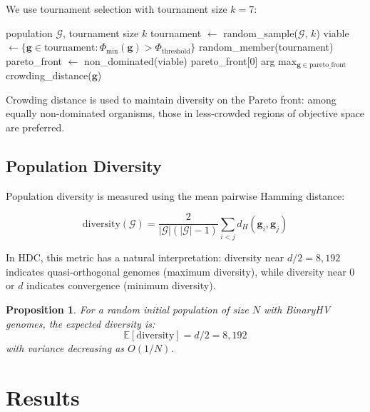 \documentclass[11pt,a4paper]{article}
\newtheorem{proposition}{Proposition}
\begin{document}
We use tournament selection with tournament size $k = 7$:

\begin{algorithm}[h]
\caption{$\Phi$-Constrained Tournament Selection}
\label{alg:tournament}
\begin{algorithmic}[1]
\REQUIRE population $\mathcal{G}$, tournament size $k$
\STATE tournament $\leftarrow$ random\_sample($\mathcal{G}$, $k$)
\STATE viable $\leftarrow \{\mathbf{g} \in \text{tournament} : \Phi_{\min}(\mathbf{g}) > \Phi_{\text{threshold}}\}$
    \RETURN random\_member(tournament) 
\ENDIF
\STATE pareto\_front $\leftarrow$ non\_dominated(viable)
    \RETURN pareto\_front[0]
\ELSE
    \RETURN arg max$_{\mathbf{g} \in \text{pareto\_front}}$ crowding\_distance($\mathbf{g}$)
\ENDIF
\end{algorithmic}
\end{algorithm}

Crowding distance \citep{deb2002} is used to maintain diversity on the Pareto front: among equally non-dominated organisms, those in less-crowded regions of objective space are preferred.

\subsection{Population Diversity}

Population diversity is measured using the mean pairwise Hamming distance:

\begin{equation}
\text{diversity}(\mathcal{G}) = \frac{2}{|\mathcal{G}|(|\mathcal{G}|-1)} \sum_{i < j} d_H(\mathbf{g}_i, \mathbf{g}_j)
\end{equation}

In HDC, this metric has a natural interpretation: diversity near $d/2 = 8{,}192$ indicates quasi-orthogonal genomes (maximum diversity), while diversity near 0 or $d$ indicates convergence (minimum diversity).

\begin{proposition}
For a random initial population of size $N$ with BinaryHV genomes, the expected diversity is:
\begin{equation}
\mathbb{E}[\text{diversity}] = d/2 = 8{,}192
\end{equation}
with variance decreasing as $O(1/N)$.
\end{proposition}

\section{Results}
\end{document}

